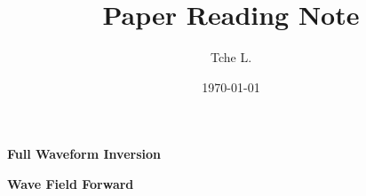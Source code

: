\documentclass{article}
\title{\Huge\bf Paper Reading Note}
\author{Tche L.}
\date{\today}
\renewcommand{\part}[1]{{\LARGE\bf\noindent #1}}
\newcommand{\pmk}{This is the brief info.}
\newcommand{\npart}{\newpage\setcounter{footnote}{0}}
\begin{document}
\maketitle
\renewcommand{\pmk}{Contents}
\tableofcontents
\newpage


\part{Full Waveform Inversion}


\vspace{5mm}


\vspace{5mm}


\vspace{5mm}


\vspace{5mm}


\vspace{5mm}


\vspace{5mm}


\vspace{5mm}


\vspace{5mm}


\vspace{5mm}


\vspace{5mm}

% 


\vspace{5mm}


\vspace{5mm}


\vspace{5mm}


\npart
\part{Wave Field Forward}


\vspace{5mm}


\vspace{5mm}
\end{document}
